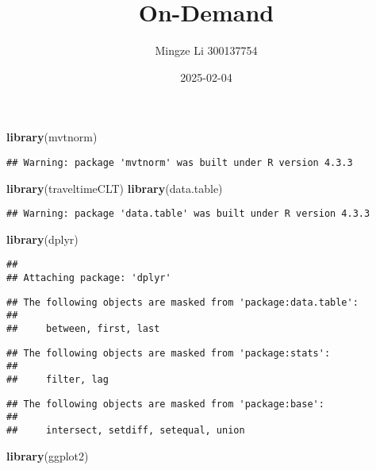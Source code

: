 \documentclass[
]{article}
\title{On-Demand}
\author{Mingze Li 300137754}
\date{2025-02-04}
\newenvironment{Shaded}{\begin{snugshade}}{\end{snugshade}}
\newcommand{\FunctionTok}[1]{\textcolor[rgb]{0.13,0.29,0.53}{\textbf{#1}}}
\newcommand{\NormalTok}[1]{#1}
\begin{document}
\maketitle

\begin{Shaded}
\begin{Highlighting}[]
\FunctionTok{library}\NormalTok{(mvtnorm)}
\end{Highlighting}
\end{Shaded}

\begin{verbatim}
## Warning: package 'mvtnorm' was built under R version 4.3.3
\end{verbatim}

\begin{Shaded}
\begin{Highlighting}[]
\FunctionTok{library}\NormalTok{(traveltimeCLT)}
\FunctionTok{library}\NormalTok{(data.table)}
\end{Highlighting}
\end{Shaded}

\begin{verbatim}
## Warning: package 'data.table' was built under R version 4.3.3
\end{verbatim}

\begin{Shaded}
\begin{Highlighting}[]
\FunctionTok{library}\NormalTok{(dplyr)}
\end{Highlighting}
\end{Shaded}

\begin{verbatim}
## 
## Attaching package: 'dplyr'
\end{verbatim}

\begin{verbatim}
## The following objects are masked from 'package:data.table':
## 
##     between, first, last
\end{verbatim}

\begin{verbatim}
## The following objects are masked from 'package:stats':
## 
##     filter, lag
\end{verbatim}

\begin{verbatim}
## The following objects are masked from 'package:base':
## 
##     intersect, setdiff, setequal, union
\end{verbatim}

\begin{Shaded}
\begin{Highlighting}[]
\FunctionTok{library}\NormalTok{(ggplot2)}
\end{Highlighting}
\end{Shaded}
\end{document}
